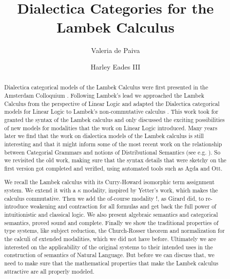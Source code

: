 \documentclass{lmcs}
\begin{document}
\title{Dialectica Categories for the Lambek Calculus}
\author[V.~de Paiva]{Valeria de Paiva}
\address{Nuance Communications, Sunnyvale, CA}
\author[H.~Eades III]{Harley Eades III}
\address{Computer Science, Augusta University, Augusta, GA}

\begin{abstract}
  Dialectica categorical models of the Lambek Calculus were first
  presented in the Amsterdam Colloquium \cite{depaiva1991}. Following
  Lambek's lead we approached the Lambek Calculus from the perspective
  of Linear Logic and adapted the Dialectica categorical models for
  Linear Logic to Lambek's non-commutative calculus
  \cite{lambek1988}. This work took for granted the syntax of the
  Lambek calculus and only discussed the exciting possibilities of new
  models for modalities that the work on Linear Logic introduced. Many
  years later we find that the work on dialectica models of the Lambek
  calculus is still interesting and that it might inform some of the
  most recent work on the relationship between Categorial Grammars and
  notions of Distributional Semantics (see e.g. \cite{coecke2013}).
  So we revisited the old work, making sure that the syntax details
  that were sketchy on the first version got completed and verified,
  using automated tools such as Agda and Ott.

  We recall the Lambek calculus with its Curry-Howard isomorphic term
  assignment system. We extend it with a $\kappa$ modality, inspired by
  Yetter's work, which makes the calculus commutative. Then we add the
  of-course modality $!$, as Girard did, to re-introduce weakening and
  contraction for all formulas and get back the full power of
  intuitionistic and classical logic. We also present algebraic
  semantics and categorical semantics, proved sound and
  complete. Finally we show the traditional properties of type systems,
  like subject reduction, the Church-Rosser theorem and normalization
  for the calculi of extended modalities, which we did not have before.
  Ultimately we are interested on the applicability of the original
  systems to their intended uses in the construction of semantics of
  Natural Language. But before we can discuss that, we need to make sure
  that the mathematical properties that make the Lambek calculus
  attractive are all properly modeled.
\end{abstract}

\maketitle
\end{document}
